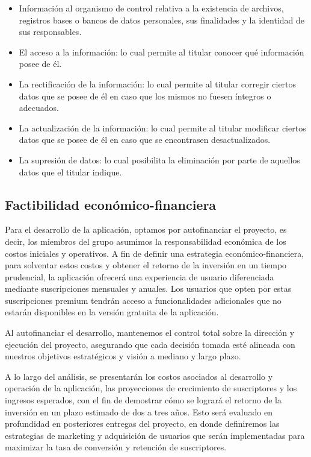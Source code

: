 \documentclass[a4paper,12pt]{article}
\begin{document}
    \begin{itemize}
        \item Información al organismo de control relativa a la existencia de archivos, registros bases o bancos de datos personales, sus finalidades y la identidad de sus responsables.
        \item El acceso a la información: lo cual permite al titular conocer qué información posee de él.
        \item La rectificación de la información: lo cual permite al titular corregir ciertos datos que se posee de él en caso que los mismos no fuesen íntegros o adecuados.
        \item La actualización de la información: lo cual permite al titular modificar ciertos datos que se posee de él en caso que se encontrasen desactualizados.
        \item La supresión de datos: lo cual posibilita la eliminación por parte de aquellos datos que el titular indique.
    \end{itemize}
    \subsection{Factibilidad económico-financiera}
    \par Para el desarrollo de la aplicación, optamos por autofinanciar el proyecto, es decir, los miembros del grupo asumimos la responsabilidad económica de los costos iniciales y operativos. A fin de definir una estrategia económico-financiera, para solventar estos costos y obtener el retorno de la inversión en un tiempo prudencial, la aplicación ofrecerá una experiencia de usuario diferenciada mediante suscripciones mensuales y anuales. Los usuarios que opten por estas suscripciones premium tendrán acceso a funcionalidades adicionales que no estarán disponibles en la versión gratuita de la aplicación.
    \par Al autofinanciar el desarrollo, mantenemos el control total sobre la dirección y ejecución del proyecto, asegurando que cada decisión tomada esté alineada con nuestros objetivos estratégicos y visión a mediano y largo plazo.
    \par A lo largo del análisis, se presentarán los costos asociados al desarrollo y operación de la aplicación, las proyecciones de crecimiento de suscriptores y los ingresos esperados, con el fin de demostrar cómo se logrará el retorno de la inversión en un plazo estimado de dos a tres años. Esto será evaluado en profundidad en posteriores entregas del proyecto, en donde definiremos las estrategias de marketing y adquisición de usuarios que serán implementadas para maximizar la tasa de conversión y retención de suscriptores.
\end{document}
